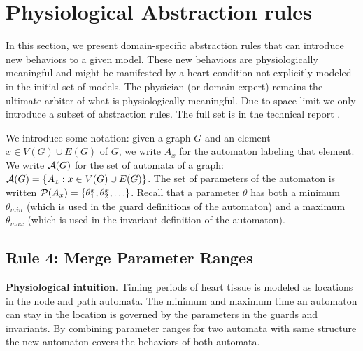 \section{Physiological Abstraction rules}
\label{abstractionRules}
In this section, we present domain-specific abstraction rules that can introduce new behaviors to a given model. 
These new behaviors are physiologically meaningful and might be manifested by a heart condition not explicitly modeled in the initial set of models.
The physician (or domain expert) remains the ultimate arbiter of what is physiologically meaningful.
Due to space limit we only introduce a subset of abstraction rules. 
The full set is in the technical report \cite{regar_tech}.

We introduce some notation: given a graph $G$ and an element $x \in V(G) \cup E(G)$ of $G$, we write $A_x$ for the automaton labeling that element.
We write $\mathcal{A}(G)$ for the set of automata of a graph: $\mathcal{A}(G) = \{A_x : x \in V(G) \cup E(G)\}$.
The set of parameters of the automaton is written $\mathcal{P}(A_x) = \{\theta_1^x,\theta_2^x,\ldots\}$. 
Recall that a parameter $\theta$ has both a minimum $\theta_{min}$ (which is used in the guard definitions of the automaton) and a maximum $\theta_{max}$ (which is used in the invariant definition of the automaton).

%
%

\subsection{Rule 4: Merge Parameter Ranges}
\textbf{Physiological intuition}. 
Timing periods of heart tissue is modeled as locations in the node and path automata. The minimum and maximum time an automaton can stay in the location is governed by the parameters in the guards and invariants. By combining parameter ranges for two automata with same structure the new automaton covers the behaviors of both automata.

